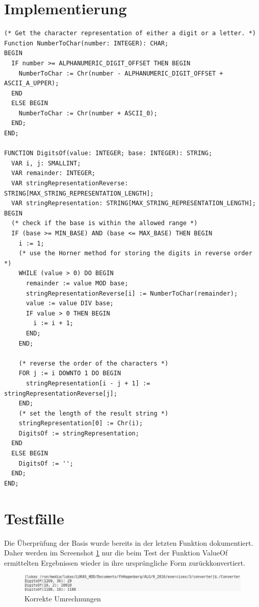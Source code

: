 \documentclass[a4paper]{article}
\begin{document}
\begin{enumerate}
\begin{enumerate}
			\section*{Implementierung}
			\begin{lstlisting}[label=scDigitsOf, resetmargins=true]
(* Get the character representation of either a digit or a letter. *)
Function NumberToChar(number: INTEGER): CHAR;
BEGIN
  IF number >= ALPHANUMERIC_DIGIT_OFFSET THEN BEGIN
    NumberToChar := Chr(number - ALPHANUMERIC_DIGIT_OFFSET + ASCII_A_UPPER);
  END
  ELSE BEGIN
    NumberToChar := Chr(number + ASCII_0);
  END;
END;

FUNCTION DigitsOf(value: INTEGER; base: INTEGER): STRING;
  VAR i, j: SMALLINT;
  VAR remainder: INTEGER;
  VAR stringRepresentationReverse: STRING[MAX_STRING_REPRESENTATION_LENGTH];
  VAR stringRepresentation: STRING[MAX_STRING_REPRESENTATION_LENGTH];
BEGIN
  (* check if the base is within the allowed range *)
  IF (base >= MIN_BASE) AND (base <= MAX_BASE) THEN BEGIN
    i := 1;
    (* use the Horner method for storing the digits in reverse order *)
    WHILE (value > 0) DO BEGIN
      remainder := value MOD base;
      stringRepresentationReverse[i] := NumberToChar(remainder);
      value := value DIV base;
      IF value > 0 THEN BEGIN
        i := i + 1;
      END;
    END;

    (* reverse the order of the characters *)
    FOR j := i DOWNTO 1 DO BEGIN
      stringRepresentation[i - j + 1] := stringRepresentationReverse[j];
    END;
    (* set the length of the result string *)
    stringRepresentation[0] := Chr(i);
    DigitsOf := stringRepresentation;
  END
  ELSE BEGIN
    DigitsOf := '';
  END;
END;
			\end{lstlisting}
			
			\clearpage
			\section*{Testfälle}
			Die Überprüfung der Basis wurde bereits in der letzten Funktion dokumentiert. Daher werden im  Screenshot \ref{tDigitsOf} nur die beim Test der Funktion ValueOf ermittelten Ergebnissen wieder in ihre ursprüngliche Form zurückkonvertiert.
			\begin{center}
				\begin{figure}[ht!]
					\includegraphics[scale=0.4]{converter/tests/digitsOf.png}
					\caption{Korrekte Umrechnungen}
					\label{tDigitsOf}
				\end{figure}
			\end{center}
			

\end{enumerate}
\end{enumerate}
\end{document}

